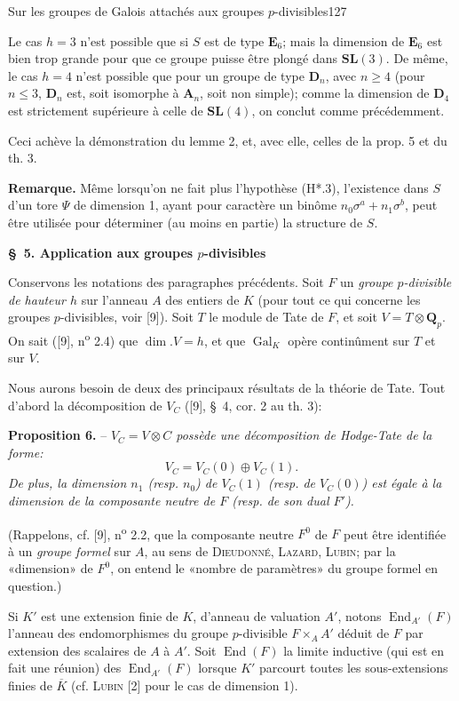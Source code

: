 Sur les groupes de Galois attachés aux groupes $p$-divisibles\hfill 127

Le cas $h=3$ n'est possible que si $S$ est de type $\mathbf E_6$; mais la dimension de $\mathbf E_6$ est bien trop grande pour que ce groupe puisse être plongé dans $\mathbf{SL}(3)$. De même, le cas $h=4$ n'est possible que pour un groupe de type $\mathbf D_n$, avec $n\geq4$ (pour $n\leq3$, $\mathbf D_n$ est, soit isomorphe à $\mathbf A_n$, soit non simple); comme la dimension de $\mathbf D_4$ est strictement supérieure à celle de $\mathbf{SL}(4)$, on conclut comme précédemment.

Ceci achève la démonstration du lemme 2, et, avec elle, celles de la prop. 5 et du th. 3.

\textbf{Remarque.} Même lorsqu'on ne fait plus l'hypothèse (H*.3), l'existence dans $S$ d'un tore $\Psi$ de dimension 1, ayant pour caractère un binôme $n_0\sigma^a+n_1\sigma^b$, peut être utilisée pour déterminer (au moins en partie) la structure de $S$.

\begin{center}\textbf{\S\ 5. Application aux groupes $p$-divisibles}\end{center}

Conservons les notations des paragraphes précédents. Soit $F$ un \textit{groupe $p$-divisible de hauteur $h$} sur l'anneau $A$ des entiers de $K$ (pour tout ce qui concerne les groupes $p$-divisibles, voir [9]). Soit $T$ le module de Tate de $F$, et soit $V=T\otimes\mathbf Q_p$. On sait ([9], n\textsuperscript{o} 2.4) que $\dim.V=h$, et que $\operatorname{Gal}_K$ opère continûment sur $T$ et sur $V$.

Nous aurons besoin de deux des principaux résultats de la théorie de Tate. Tout d'abord la décomposition de $V_C$ ([9], \S\ 4, cor. 2 au th. 3):

\textbf{Proposition 6.} -- \textit{$V_C=V\otimes C$ possède une décomposition de Hodge-Tate de la forme:}
\[
V_C=V_C(0)\oplus V_C(1).
\]
\textit{De plus, la dimension $n_1$ (resp. $n_0$) de $V_C(1)$ (resp. de $V_C(0)$) est égale à la dimension de la composante neutre de $F$ (resp. de son dual $F'$).}

(Rappelons, cf. [9], n\textsuperscript{o} 2.2, que la composante neutre $F^0$ de $F$ peut être identifiée à un \textit{groupe formel} sur $A$, au sens de \textsc{Dieudonné}, \textsc{Lazard}, \textsc{Lubin}; par la «dimension» de $F^0$, on entend le «nombre de paramètres» du groupe formel en question.)

Si $K'$ est une extension finie de $K$, d'anneau de valuation $A'$, notons $\operatorname{End}_{A'}(F)$ l'anneau des endomorphismes du groupe $p$-divisible $F\times_A A'$ déduit de $F$ par extension des scalaires de $A$ à $A'$. Soit $\operatorname{End}(F)$ la limite inductive (qui est en fait une réunion) des $\operatorname{End}_{A'}(F)$ lorsque $K'$ parcourt toutes les sous-extensions finies de $\overline K$ (cf. \textsc{Lubin} [2] pour le cas de dimension 1).
